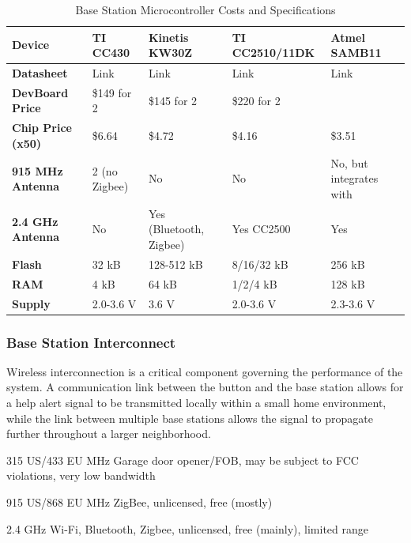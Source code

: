 \documentclass[journal,compsoc]{IEEEtran}
\begin{document}
\begin{table}[H]
  \centering
  \begin{tabular}{>{\bfseries}l|l l l l}
    Device & TI CC430 & Kinetis KW30Z & TI CC2510/11DK & Atmel SAMB11 \\
    \hline
    Datasheet & Link & Link & Link & Link \\
    DevBoard Price & \$149 for 2 & \$145 for 2 & \$220 for 2 & \\
    Chip Price (x50) & \$6.64 & \$4.72 & \$4.16 & \$3.51 \\
    915 MHz Antenna & 2 (no Zigbee) & No & No & No, but integrates with \\
    2.4 GHz Antenna & No & Yes (Bluetooth, Zigbee) & Yes CC2500 & Yes \\
    Flash & 32 kB & 128-512 kB & 8/16/32 kB & 256 kB \\
    RAM & 4 kB & 64 kB & 1/2/4 kB & 128 kB \\
    Supply & 2.0-3.6 V & 3.6 V & 2.0-3.6 V & 2.3-3.6 V
  \end{tabular}
  \caption{Base Station Microcontroller Costs and Specifications}
\end{table}

\subsubsection{Base Station Interconnect}

Wireless interconnection is a critical component governing the performance of the system.  A communication link between the button and the base station allows for a help alert signal to be transmitted locally within a small home environment, while the link between multiple base stations allows the signal to propagate further throughout a larger neighborhood.

\begin{LaTeXdescription}
	\item[315 US/433 EU MHz] Garage door opener/FOB, may be subject to FCC violations, very low bandwidth
    \item[915 US/868 EU MHz] ZigBee, unlicensed, free (mostly)
    \item[2.4 GHz] Wi-Fi, Bluetooth, Zigbee, unlicensed, free (mainly), limited range
\end{LaTeXdescription}
\end{document}
